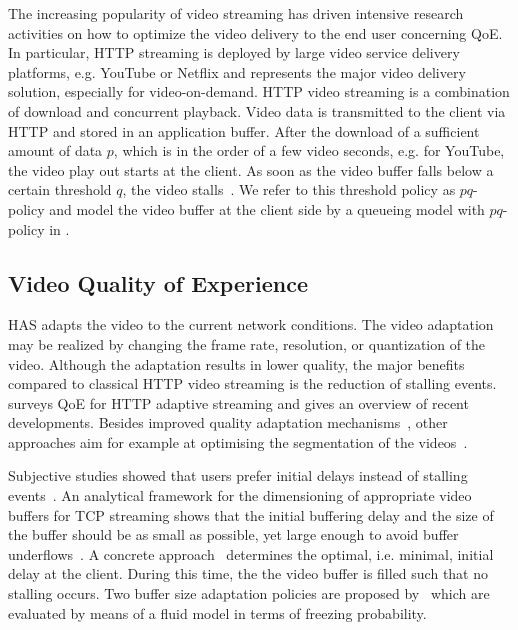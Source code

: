 The increasing popularity of video streaming has driven intensive research activities on how to optimize the video delivery to the end user concerning \gls{QoE}.
In particular, \gls{HTTP} streaming is deployed by large video service delivery platforms, e.g. YouTube or Netflix and represents the major video delivery solution, especially for video-on-demand.
\gls{HTTP} video streaming is a combination of download and concurrent playback.
Video data is transmitted to the client via \gls{HTTP} and stored in an application buffer.
After the download of a sufficient amount of data \(p\), which is in the order of a few video seconds, e.g. for YouTube, the video play out starts at the client.
As soon as the video buffer falls below a certain threshold \(q\), the video stalls~\cite{Hossfeld2013c}.
We refer to this threshold policy as \(pq\)-policy and model the video buffer at the client side by a queueing model with \(pq\)-policy in .

\subsection{Video Quality of Experience}\label{sec:application:background:application_qoe}
\gls{HAS} adapts the video to the current network conditions.
The video adaptation may be realized by changing the frame rate, resolution, or quantization of the video. Although the adaptation results in lower quality, the major benefits compared to classical \gls{HTTP} video streaming is the reduction of stalling events.
\cite{Seufert2014} surveys \gls{QoE} for \gls{HTTP} adaptive streaming and gives an overview of recent developments. 
Besides improved quality adaptation mechanisms~\cite{Sieber2013}, other approaches aim for example at optimising the segmentation of the videos~\cite{Lievens2013}.

Subjective studies showed that users prefer initial delays instead of stalling events~\cite{Hossfeld2012c}.
An analytical framework for the dimensioning of appropriate video buffers for \gls{TCP} streaming shows that the initial buffering delay and the size of the buffer should be as small as possible, yet large enough to avoid buffer underflows~\cite{Yan2011}. 
A concrete approach~\cite{Hossfeld2012b} determines the optimal, i.e. minimal, initial delay at the client.
During this time, the the video buffer is filled such that no stalling occurs.
Two buffer size adaptation policies are proposed by~\cite{Fiedler2014} which are evaluated by means of a fluid model in terms of freezing probability. 

